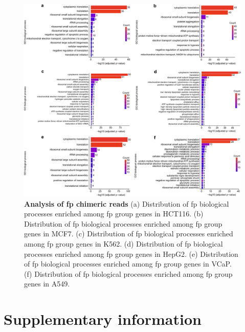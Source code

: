 \documentclass[pdflatex, sn-mathphys-num, lineno]{sn-jnl}%
\theoremstyle{thmstyleone}%
\theoremstyle{thmstyletwo}%
\theoremstyle{thmstylethree}%
\begin{document}
\begin{figure}[!h]
	\includegraphics[height=0.87\columnwidth]{finals/sf4}
	\caption{ {\bf  Analysis of \gls{fp} chimeric reads } (a) Distribution of \gls{fp} biological processes enriched among \gls{fp} group genes in HCT116. (b) Distribution of \gls{fp} biological processes enriched among \gls{fp} group genes in MCF7. (c) Distribution of \gls{fp} biological processes enriched among \gls{fp} group genes in K562. (d) Distribution of \gls{fp} biological processes enriched among \gls{fp} group genes in HepG2. (e) Distribution of \gls{fp} biological processes enriched among \gls{fp} group genes in VCaP. (f) Distribution of \gls{fp} biological processes enriched among \gls{fp} group genes in A549.}
	\label{fig:sf4}
\end{figure}



\newpage

\section{Supplementary information}

\renewcommand{\figurename}{Supplementary Fig.}
\renewcommand{\tablename}{Supplementary Table}


\end{document}
